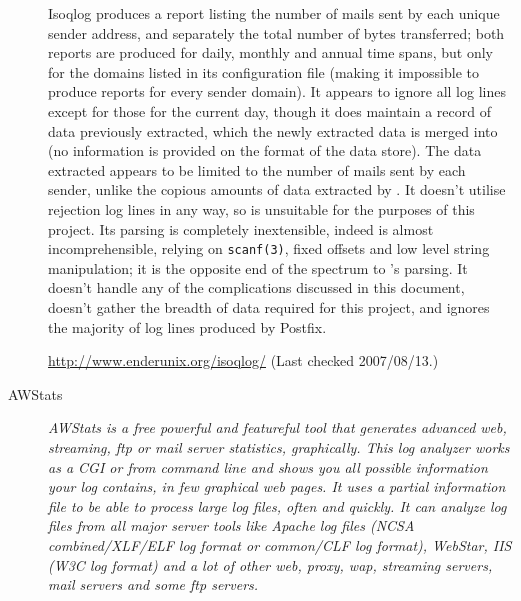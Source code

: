 \documentclass[a4paper,12pt,draft]{article}
\newcommand{\parsername}{\PLP{}}
\newcommand{\parsernames}{\PLP{}'s}
\begin{document}
\begin{description}
        Isoqlog produces a report listing the number of mails sent by each
        unique sender address, and separately the total number of bytes
        transferred; both reports are produced for daily, monthly and
        annual time spans, but only for the domains listed in its
        configuration file (making it impossible to produce reports for
        every sender domain).  It appears to ignore all log lines except
        for those for the current day, though it does maintain a record of
        data previously extracted, which the newly extracted data is merged
        into (no information is provided on the format of the data store).
        The data extracted appears to be limited to the number of mails
        sent by each sender, unlike the copious amounts of data extracted
        by \parsername{}.  It doesn't utilise rejection log lines in any
        way, so is unsuitable for the purposes of this project.  Its
        parsing is completely inextensible, indeed is almost
        incomprehensible, relying on \texttt{scanf(3)}, fixed offsets and
        low level string manipulation; it is the opposite end of the
        spectrum to \parsernames{} parsing.  It doesn't handle any of the
        complications discussed in this document, doesn't gather the
        breadth of data required for this project, and ignores the majority
        of log lines produced by Postfix.

        \url{http://www.enderunix.org/isoqlog/} \newline (Last checked
        2007/08/13.)

    \item [AWStats] \textit{AWStats is a free powerful and featureful tool
        that generates advanced web, streaming, ftp or mail server
        statistics, graphically. This log analyzer works as a CGI or from
        command line and shows you all possible information your log
        contains, in few graphical web pages. It uses a partial information
        file to be able to process large log files, often and quickly. It
        can analyze log files from all major server tools like Apache log
        files (NCSA combined/XLF/ELF log format or common/CLF log format),
        WebStar, IIS (W3C log format) and a lot of other web, proxy, wap,
        streaming servers, mail servers and some ftp servers.\/}


\end{description}
\end{document}

